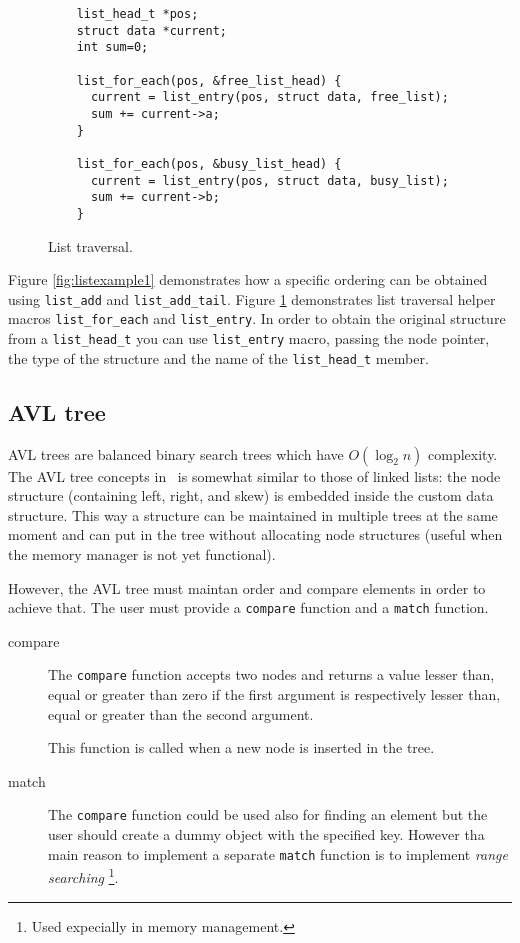 \begin{figure}[h!]
  \begin{verbatim}
    list_head_t *pos;
    struct data *current;
    int sum=0;

    list_for_each(pos, &free_list_head) {
      current = list_entry(pos, struct data, free_list);
      sum += current->a;
    }

    list_for_each(pos, &busy_list_head) {
      current = list_entry(pos, struct data, busy_list);
      sum += current->b;
    }
  \end{verbatim}
  \caption{List traversal.}
  \label{fig:listexample2}
\end{figure}

Figure \ref{fig:listexample1} demonstrates how a specific ordering 
can be obtained using \texttt{list\_add} and \texttt{list\_add\_tail}.
 Figure \ref{fig:listexample2} demonstrates list traversal helper macros
\texttt{list\_for\_each} and \texttt{list\_entry}.
In order to obtain the original structure from a \texttt{list\_head\_t}
you can use \texttt{list\_entry} macro, passing the node pointer, the
type of the structure and the name of the \texttt{list\_head\_t} member.

\subsection{AVL tree}

AVL trees are balanced binary search trees which have $O(\log_{2} n)$ complexity.
The AVL tree concepts in \acaros\ is somewhat similar to those of linked lists:
 the node structure (containing left, right, and skew) is embedded inside the 
custom data structure. This way a structure can be maintained in multiple trees 
at the same moment and can put in the tree without allocating node structures 
(useful when the memory manager is not yet functional).

However, the AVL tree must maintan order and compare elements in order to achieve that.
The user must provide a \texttt{compare} function and a \texttt{match} function.

\begin{description}
\item[compare]
  The \texttt{compare} function accepts two nodes and returns a value lesser than, equal or greater
  than zero if the first argument is respectively lesser than, equal or greater than the second
  argument.
  
  This function is called when a new node is inserted in the tree.
  
\item[match]
  The \texttt{compare} function could be used also for finding an element but
  the user should create a dummy object with the specified key. However tha main
  reason to implement a separate \texttt{match} function is to implement \emph{range searching}
  \footnote{Used expecially in memory management.}.
\end{description}

